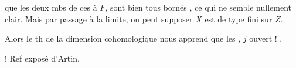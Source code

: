 
que 
les deux mbs de ces  à $F$, sont
bien tous bornés , ce qui ne semble
nullement clair. Mais par passage à la limite,
on peut supposer $X$ est de type fini sur $Z$.

Alors le th de la dimension cohomologique
nous apprend que les
, $j$ ouvert
 ! , 

! Ref exposé d'Artin.
